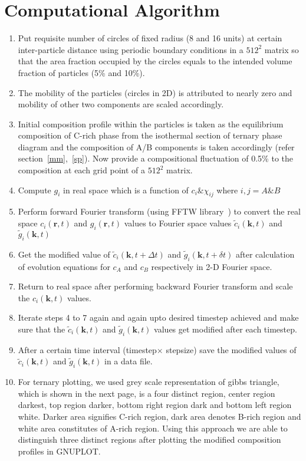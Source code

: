 \documentclass[12pt]{iiscthes}
\theoremstyle{definition}
\theoremstyle{definition}
\theoremstyle{remark}
\begin{document}
\section{Computational Algorithm}\label{algo}
\begin{enumerate}
\item Put requisite number of circles of fixed radius (8 and 16 units) at certain inter-particle distance using periodic boundary conditions  in  a $512^2$ matrix so that the area fraction occupied by the circles equals to the intended volume fraction of particles (5\% and 10\%).
\item The mobility of the particles (circles in 2D) is attributed to nearly zero and mobility of other two components are scaled accordingly.
\item Initial composition profile within the particles is taken as the equilibrium composition of C-rich phase from the isothermal section of ternary phase diagram and the composition of A/B components is taken accordingly (refer section~\ref{mm},~\ref{sp}). Now provide a compositional fluctuation of 0.5\% to the composition at each grid point of a $512^2$ matrix.
\item Compute $ g_i $ in real space which is a function of $ c_i \& \chi_{ij} $ where $ i, j = A \& B $
\item Perform forward Fourier transform (using FFTW library~\cite{Frigo}) to convert the real space $  c_i\left(\mathbf{r},t\right)$ and $  g_i\left(\mathbf{r},t\right)$ values to Fourier space values $  \tilde c_i\left(\mathbf{k},t\right)$ and $  \tilde g_i\left(\mathbf{k},t\right)$
\item Get the modified value of   $\tilde c_i\left(\mathbf{k},t+\Delta t\right)$ and $  \tilde g_i\left(\mathbf{k},t+ \delta t\right)$ after calculation of evolution equations for $c_A $ and  $ c_B$ respectively in 2-D Fourier space.
\item Return to real space after performing backward Fourier transform and scale the $ c_i\left(\mathbf{k},t\right)$ values.
\item Iterate steps 4 to 7 again and again upto desired timestep achieved and make sure that the $  \tilde c_i\left(\mathbf{k},t\right)$ and $  \tilde g_i\left(\mathbf{k},t\right)$ values get modified after each timestep.
\item After a certain time interval (timestep$ \times $ stepsize)  save the modified values of $  \tilde c_i\left(\mathbf{k},t\right)$ and $  \tilde g_i\left(\mathbf{k},t\right)$  in a data file.
\item For ternary plotting, we used grey scale representation of gibbs triangle, which is shown in the next page, is a four distinct region, center region darkest, top region  darker, bottom right region dark and bottom left region white. Darker area signifies C-rich region, dark area denotes B-rich region and white area constitutes of A-rich region. Using this approach we are able to distinguish three distinct regions after plotting the modified composition profiles in GNUPLOT.   
\end{enumerate}  
\end{document}
